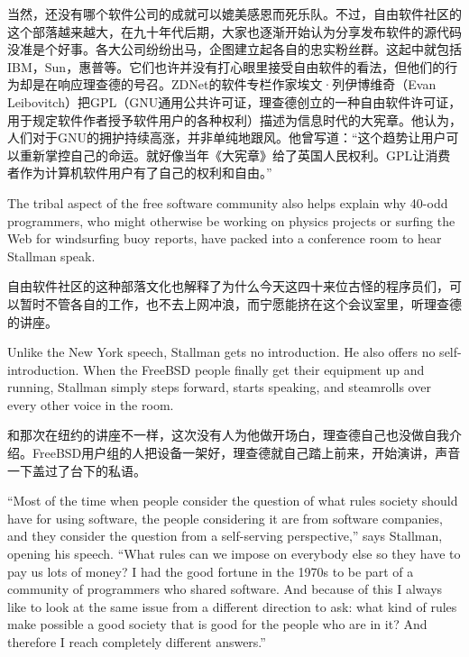 \ifdefined\chs
当然，还没有哪个软件公司的成就可以媲美感恩而死乐队。不过，自由软件社区的这个部落越来越大，在九十年代后期，大家也逐渐开始认为分享发布软件的源代码没准是个好事。各大公司纷纷出马，企图建立起各自的忠实粉丝群。这起中就包括IBM，Sun，惠普等。它们也许并没有打心眼里接受自由软件的看法，但他们的行为却是在响应理查德的号召。ZDNet的软件专栏作家埃文·列伊博维奇（Evan Leibovitch）把GPL（GNU通用公共许可证，理查德创立的一种自由软件许可证，用于规定软件作者授予软件用户的各种权利）描述为信息时代的大宪章。他认为，人们对于GNU的拥护持续高涨，并非单纯地跟风。他曾写道：“这个趋势让用户可以重新掌控自己的命运。就好像当年《大宪章》给了英国人民权利。GPL让消费者作为计算机软件用户有了自己的权利和自由。”
\fi

\ifdefined\eng
The tribal aspect of the free software community also helps explain why 40-odd programmers, who might otherwise be working on physics projects or surfing the Web for windsurfing buoy reports, have packed into a conference room to hear Stallman speak.
\fi

\ifdefined\chs
自由软件社区的这种部落文化也解释了为什么今天这四十来位古怪的程序员们，可以暂时不管各自的工作，也不去上网冲浪，而宁愿能挤在这个会议室里，听理查德的讲座。
\fi

\ifdefined\eng
Unlike the New York speech, Stallman gets no introduction. He also offers no self-introduction. When the FreeBSD people finally get their equipment up and running, Stallman simply steps forward, starts speaking, and steamrolls over every other voice in the room.
\fi

\ifdefined\chs
和那次在纽约的讲座不一样，这次没有人为他做开场白，理查德自己也没做自我介绍。FreeBSD用户组的人把设备一架好，理查德就自己踏上前来，开始演讲，声音一下盖过了台下的私语。
\fi

\ifdefined\eng
``Most of the time when people consider the question of what rules society should have for using software, the people considering it are from software companies, and they consider the question from a self-serving perspective,'' says Stallman, opening his speech. ``What rules can we impose on everybody else so they have to pay us lots of money? I had the good fortune in the 1970s to be part of a community of programmers who shared software. And because of this I always like to look at the same issue from a different direction to ask: what kind of rules make possible a good society that is good for the people who are in it? And therefore I reach completely different answers.''
\fi

